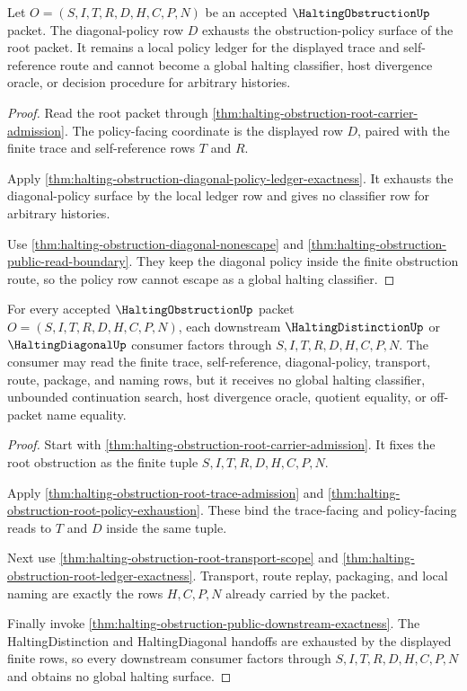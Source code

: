 \begin{theorem}
\label{thm:halting-obstruction-root-policy-exhaustion}
Let $O=(S,I,T,R,D,H,C,P,N)$ be an accepted $\HaltingObstructionUp$ packet. The diagonal-policy row $D$ exhausts the obstruction-policy surface of the root packet. It remains a local policy ledger for the displayed trace and self-reference route and cannot become a global halting classifier, host divergence oracle, or decision procedure for arbitrary histories.
\end{theorem}
\begin{proof}
Read the root packet through \autoref{thm:halting-obstruction-root-carrier-admission}. The policy-facing coordinate is the displayed row $D$, paired with the finite trace and self-reference rows $T$ and $R$.

Apply \autoref{thm:halting-obstruction-diagonal-policy-ledger-exactness}. It exhausts the diagonal-policy surface by the local ledger row and gives no classifier row for arbitrary histories.

Use \autoref{thm:halting-obstruction-diagonal-nonescape} and \autoref{thm:halting-obstruction-public-read-boundary}. They keep the diagonal policy inside the finite obstruction route, so the policy row cannot escape as a global halting classifier.
\end{proof}

\begin{theorem}
\label{thm:halting-obstruction-root-consumer-boundary}
For every accepted $\HaltingObstructionUp$ packet $O=(S,I,T,R,D,H,C,P,N)$, each downstream $\HaltingDistinctionUp$ or $\HaltingDiagonalUp$ consumer factors through $S,I,T,R,D,H,C,P,N$. The consumer may read the finite trace, self-reference, diagonal-policy, transport, route, package, and naming rows, but it receives no global halting classifier, unbounded continuation search, host divergence oracle, quotient equality, or off-packet name equality.
\end{theorem}
\begin{proof}
Start with \autoref{thm:halting-obstruction-root-carrier-admission}. It fixes the root obstruction as the finite tuple $S,I,T,R,D,H,C,P,N$.

Apply \autoref{thm:halting-obstruction-root-trace-admission} and \autoref{thm:halting-obstruction-root-policy-exhaustion}. These bind the trace-facing and policy-facing reads to $T$ and $D$ inside the same tuple.

Next use \autoref{thm:halting-obstruction-root-transport-scope} and \autoref{thm:halting-obstruction-root-ledger-exactness}. Transport, route replay, packaging, and local naming are exactly the rows $H,C,P,N$ already carried by the packet.

Finally invoke \autoref{thm:halting-obstruction-public-downstream-exactness}. The HaltingDistinction and HaltingDiagonal handoffs are exhausted by the displayed finite rows, so every downstream consumer factors through $S,I,T,R,D,H,C,P,N$ and obtains no global halting surface.
\end{proof}

